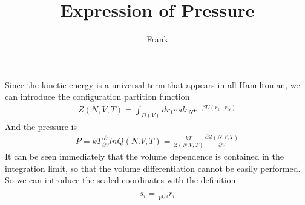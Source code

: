 \documentclass{article}
\title{Expression of Pressure }
\author{Frank}
\begin{document}
\maketitle
Since the kinetic energy is a universal term that appears in all Hamiltonian, we can introduce the configuration partition function
\begin{align}
Z(N,V,T)=\int_{D(V)}dr_1\cdots dr_Ne^{-\beta U(r_1\cdots r_N)}
\end{align}
And the pressure is
\begin{align}
P=kT\frac{\partial}{\partial V}lnQ(N.V,T)=\frac{kT}{Z(N.V,T)}\frac{\partial Z(N.V,T)}{\partial V}
\end{align}
It can be seen immediately that the volume dependence is contained in the integration limit, so that the volume differentiation cannot be easily performed. \\
So we can introduce the scaled coordinates with the definition 
\begin{align}
s_i=\frac{1}{V^{1/3}}r_i
\end{align}
\end{document}
